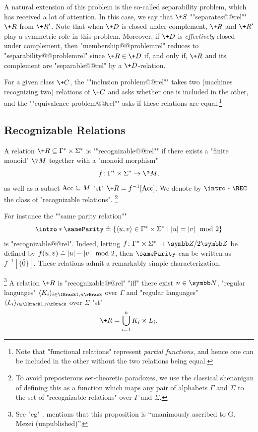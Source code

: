 A natural extension of this problem is the so-called separability problem,
which has received a lot of attention.
In this case, we say that $\+S$ ""separates@@rel"" $\+R$ from $\+R'$.
Note that when $\+D$ is closed under complement, $\+R$ and $\+R'$ play a symmetric role in this problem. Moreover, if $\+D$ is \emph{effectively} closed under complement,
then "membership@@problemrel" reduces to "separability@@problemrel" 
since $\+R \in \+D$ if, and only if, $\+R$ and its complement are "separable@@rel" by
a $\+D$-relation.

For a given class $\+C$, the \AP""inclusion problem@@rel"" takes two (machines recognizing two) 
relations of $\+C$ and asks whether one is included in the other, and the \AP""equivalence 
problem@@rel"" asks if these relations are equal.\footnote{Note that "functional relations"
represent \emph{partial functions}, and hence one can be included in the other without the
two relations being equal.}



\subsection{Recognizable Relations}

A relation $\+R \subseteq \Gamma^* \times \Sigma^*$ is \AP""recognizable@@rel""
if there exists a "finite monoid" $\?M$ together with a "monoid morphism"
\[
	f\colon \Gamma^* \times \Sigma^* \to \?M,
\]
as well as a subset $\textrm{Acc} \subseteq M$ "st"
$\+R = f^{-1}[\Acc]$. We denote by \AP$\intro*\REC$ the class of "recognizable relations".%
\footnote{To avoid preposterous set-theoretic paradoxes, 
we use the classical shenanigan of defining this as a function which maps
any pair of alphabets $\Gamma$ and $\Sigma$ to the set of "recognizable relations" over $\Gamma$ and $\Sigma$.}

For instance the \AP""same parity relation""
\[
	{\intro*\sameParity} \defeq 
	\{
		\tup{u,v} \in \Gamma^* \times \Sigma^* \mid
		|u| = |v| \mod{2}
	\}
\]
is "recognizable@@rel". Indeed, letting $f\colon  \Gamma^* \times \Sigma^* \to \ZnZ{2}$
be defined by $f(u,v) \mathrel{\hat{=}} |u| - |v| \mod{2}$,
then $\sameParity$ can be written as $f^{-1}[\{\bar 0\}]$.
These relations admit a remarkably simple characterization.\AP
\begin{proposition}
	\!\footnote{See "eg" \cite[Corollary~II.2.20, p.~254]{Sakarovitch2009Elements}.
	\cite[\S~2, ``Notes \& references'']{Sakarovitch2009Elements} mentions
	that this proposition is ``unanimously ascribed to G. Mezei (unpublished)''.}
	\label{prop:Mezei-theorem}
	A relation $\+R$ is "recognizable@@rel" "iff" there exist $n\in\N$,
	"regular languages" $\tup{K_i}_{i\in \lBrack 1,n\rBrack}$ over $\Gamma$
	and "regular languages" $\tup{L_i}_{i\in \lBrack 1,n\rBrack}$ over $\Sigma$
	"st"
	\[
		\+R = \bigcup_{i=1}^n K_i \times L_i.
	\]
\end{proposition}

